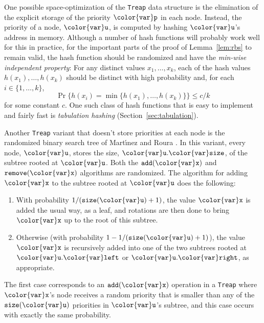 \documentclass[10pt]{book}
\newcommand{\secref}[1]{Section~\ref{sec:#1}}
\theoremstyle{plain}
\newcommand{\lemref}[1]{Lemma~\ref{lem:#1}}
\theoremstyle{definition}
\begin{document}
One possible space-optimization of the \texttt{Treap} data structure 
is the elimination of the explicit storage of the priority \ensuremath{\mathtt{{\color{var}p}}}
in each node. Instead, the priority of a node, \ensuremath{\mathtt{{\color{var}u}}}, is computed by
hashing \ensuremath{\mathtt{{\color{var}u}}}'s address in memory.  Although a number of hash functions will
probably work well for this in practice, for the important parts of the
proof of \lemref{rbs} to remain valid, the hash function should be randomized
and have the \emph{min-wise independent property}:
%
For any distinct
values $x_1,\ldots,x_k$, each of the hash values $h(x_1),\ldots,h(x_k)$
should be distinct with high probability and, for each $i\in\{1,\ldots,k\}$,
\[
   \Pr\{h(x_i) = \min\{h(x_1),\ldots,h(x_k)\}\} \le c/k
\]
for some constant $c$.
One such class of hash functions that is easy to implement and fairly
fast is \emph{tabulation hashing} (\secref{tabulation}).
%
%

Another \texttt{Treap} variant that doesn't store priorities at each node is
the randomized binary search tree
%
%
of Mart\'\i nez and Roura \cite{mr98}.
In this variant, every node, \ensuremath{\mathtt{{\color{var}u}}}, stores the size, \ensuremath{\mathtt{{\color{var}u}.{\color{var}size}}}, of the
subtree rooted at \ensuremath{\mathtt{{\color{var}u}}}.  Both the \ensuremath{\mathtt{add({\color{var}x})}} and \ensuremath{\mathtt{remove({\color{var}x})}} algorithms are
randomized. The algorithm for adding \ensuremath{\mathtt{{\color{var}x}}} to the subtree rooted at \ensuremath{\mathtt{{\color{var}u}}}
does the following:
\begin{enumerate}
   \item With probability $1/(\ensuremath{\mathtt{size({\color{var}u})}}+1)$, the value \ensuremath{\mathtt{{\color{var}x}}} is added
   the usual way, as a leaf, and rotations are then done to bring \ensuremath{\mathtt{{\color{var}x}}}
   up to the root of this subtree.
   \item Otherwise (with probability $1-1/(\ensuremath{\mathtt{size({\color{var}u})}}+1)$), the value \ensuremath{\mathtt{{\color{var}x}}}
   is recursively added into one of the two subtrees rooted at \ensuremath{\mathtt{{\color{var}u}.{\color{var}left}}}
   or \ensuremath{\mathtt{{\color{var}u}.{\color{var}right}}}, as appropriate.
\end{enumerate}
The first case corresponds to an \ensuremath{\mathtt{add({\color{var}x})}} operation in a \texttt{Treap} where
\ensuremath{\mathtt{{\color{var}x}}}'s node receives a random priority that is smaller than any of the
\ensuremath{\mathtt{size({\color{var}u})}} priorities in \ensuremath{\mathtt{{\color{var}u}}}'s subtree, and this case occurs with exactly
the same probability.
\end{document}
